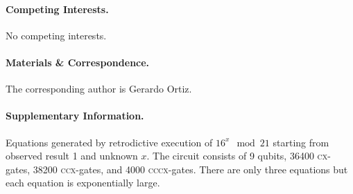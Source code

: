 \documentclass{article}
\newcommand{\cx}{\textsc{cx}}
\newcommand{\ccx}{\textsc{ccx}}
\newcommand{\cccx}{\textsc{cccx}}
\begin{document}
\begin{refsection}
\paragraph*{Competing Interests.}
No competing interests.

\paragraph*{Materials \& Correspondence.}
The corresponding author is Gerardo Ortiz. 

\paragraph*{Supplementary Information.} 
\label{par:shor21}

Equations generated by retrodictive execution of $16^x \mod{21}$
starting from observed result 1 and unknown $x$. The circuit consists
of 9 qubits, 36400 \cx-gates, 38200 \ccx-gates, and 4000
\cccx-gates. There are only three equations but each equation is
exponentially large.


\end{refsection}
\end{document}
